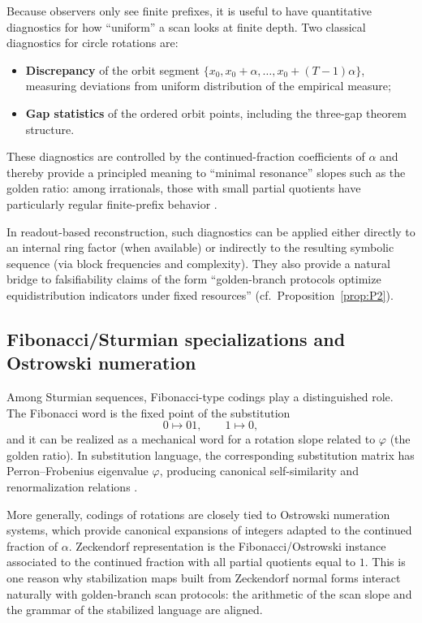 Because observers only see finite prefixes, it is useful to have quantitative diagnostics for how ``uniform'' a scan looks at finite depth. Two classical diagnostics for circle rotations are:
\begin{itemize}[leftmargin=*,itemsep=2pt]
  \item \textbf{Discrepancy} of the orbit segment $\{x_0, x_0+\alpha,\dots,x_0+(T-1)\alpha\}$, measuring deviations from uniform distribution of the empirical measure;
  \item \textbf{Gap statistics} of the ordered orbit points, including the three-gap theorem structure.
\end{itemize}
These diagnostics are controlled by the continued-fraction coefficients of $\alpha$ and thereby provide a principled meaning to ``minimal resonance'' slopes such as the golden ratio: among irrationals, those with small partial quotients have particularly regular finite-prefix behavior \cite{KuipersNiederreiter1974}.

In readout-based reconstruction, such diagnostics can be applied either directly to an internal ring factor (when available) or indirectly to the resulting symbolic sequence (via block frequencies and complexity). They also provide a natural bridge to falsifiability claims of the form ``golden-branch protocols optimize equidistribution indicators under fixed resources'' (cf.\ Proposition~\ref{prop:P2}).

\subsection{Fibonacci/Sturmian specializations and Ostrowski numeration}\label{sec:readout:fibonacci}

Among Sturmian sequences, Fibonacci-type codings play a distinguished role. The Fibonacci word is the fixed point of the substitution
\[
0\mapsto 01,\qquad 1\mapsto 0,
\]
and it can be realized as a mechanical word for a rotation slope related to $\varphi$ (the golden ratio). In substitution language, the corresponding substitution matrix has Perron--Frobenius eigenvalue $\varphi$, producing canonical self-similarity and renormalization relations \cite{Queffelec2010}.

More generally, codings of rotations are closely tied to Ostrowski numeration systems, which provide canonical expansions of integers adapted to the continued fraction of $\alpha$. Zeckendorf representation is the Fibonacci/Ostrowski instance associated to the continued fraction with all partial quotients equal to $1$. This is one reason why stabilization maps built from Zeckendorf normal forms interact naturally with golden-branch scan protocols: the arithmetic of the scan slope and the grammar of the stabilized language are aligned.

